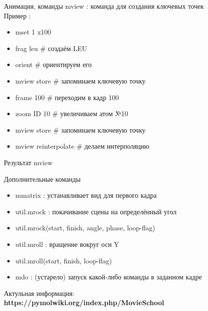 	  \begin{frame}{Анимация, команды}
			  mview : команда для создания ключевых точек \\
				  Пример :
		  \begin{itemize}
			  \item \textcolor{blue!40!white}{mset 1 x100}
			  \item \textcolor{blue!40!white}{frag leu}  \# создаём LEU
			  \item \textcolor{blue!40!white}{orient}    \# ориентируем его 
			  \item \textcolor{blue!40!white}{mview store} \# запоминаем ключевую точку
			  \item \textcolor{blue!40!white}{frame 100} \# переходим в кадр 100
			  \item \textcolor{blue!40!white}{zoom ID 10} \#  увеличиваем атом №10
			  \item \textcolor{blue!40!white}{mview store} \# запоминаем ключевую точку
			  \item \textcolor{blue!40!white}{mview reinterpolate} \# делаем интерполяцию
			  \end{itemize}
		  \end{frame}
		  
		  \begin{frame}{Результат mview}
          \begin{center} 
          \end{center}
	  \end{frame}

	  \begin{frame}{Дополнительные команды}
		  \begin{itemize}
			  \item \textcolor{blue!40!white}{mmatrix} : устанавливает вид для первого кадра
			  \item \textcolor{blue!40!white}{util.mrock} : покачивание сцены на определённый угол 
			  \item \textcolor{blue!40!white}{util.mrock(start, finish, angle, phase, loop-flag) }
			  \item \textcolor{blue!40!white}{util.mroll} : вращение вокруг оси Y
			  \item \textcolor{blue!40!white}{util.mroll(start, finish, loop-flag)}
			  \item \textcolor{blue!40!white}{mdo} : (устарело) запуск какой-либо команды в заданном кадре
		   \end{itemize}
        Актульная информация:\\
        \textbf{https://pymolwiki.org/index.php/MovieSchool}

\end{frame}

